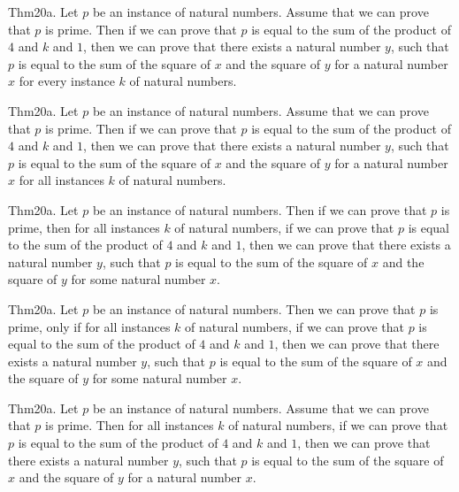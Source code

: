 \documentclass{article}
\begin{document}
Thm20a. Let $p$ be an instance of natural numbers. Assume that we can prove that $p$ is prime. Then if we can prove that $p$ is equal to the sum of the product of $4$ and $k$ and $1$, then we can prove that there exists a natural number $y$, such that $p$ is equal to the sum of the square of $x$ and the square of $y$ for a natural number $x$ for every instance $k$ of natural numbers.

Thm20a. Let $p$ be an instance of natural numbers. Assume that we can prove that $p$ is prime. Then if we can prove that $p$ is equal to the sum of the product of $4$ and $k$ and $1$, then we can prove that there exists a natural number $y$, such that $p$ is equal to the sum of the square of $x$ and the square of $y$ for a natural number $x$ for all instances $k$ of natural numbers.

Thm20a. Let $p$ be an instance of natural numbers. Then if we can prove that $p$ is prime, then for all instances $k$ of natural numbers, if we can prove that $p$ is equal to the sum of the product of $4$ and $k$ and $1$, then we can prove that there exists a natural number $y$, such that $p$ is equal to the sum of the square of $x$ and the square of $y$ for some natural number $x$.

Thm20a. Let $p$ be an instance of natural numbers. Then we can prove that $p$ is prime, only if for all instances $k$ of natural numbers, if we can prove that $p$ is equal to the sum of the product of $4$ and $k$ and $1$, then we can prove that there exists a natural number $y$, such that $p$ is equal to the sum of the square of $x$ and the square of $y$ for some natural number $x$.

Thm20a. Let $p$ be an instance of natural numbers. Assume that we can prove that $p$ is prime. Then for all instances $k$ of natural numbers, if we can prove that $p$ is equal to the sum of the product of $4$ and $k$ and $1$, then we can prove that there exists a natural number $y$, such that $p$ is equal to the sum of the square of $x$ and the square of $y$ for a natural number $x$.
\end{document}
